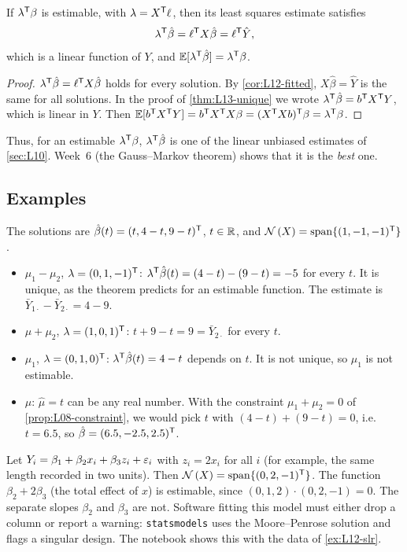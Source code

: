 \begin{proposition}\label{prop:L13-unbiased}
If $\lambda^{\mathsf T}\beta$ is estimable, with $\lambda=X^{\mathsf T}\ell$, then its least squares estimate satisfies
\[
\lambda^{\mathsf T}\hat\beta=\ell^{\mathsf T} X\hat\beta=\ell^{\mathsf T}\hat Y,
\]
which is a linear function of $Y$, and $\mathbb E[\lambda^{\mathsf T}\hat\beta]=\lambda^{\mathsf T}\beta$.
\end{proposition}
\begin{proof}
$\lambda^{\mathsf T}\hat\beta=\ell^{\mathsf T} X\hat\beta$ holds for every solution. By \cref{cor:L12-fitted}, $X\hat\beta=\hat Y$ is the same for
all solutions. In the proof of \cref{thm:L13-unique} we wrote $\lambda^{\mathsf T}\hat\beta=b^{\mathsf T} X^{\mathsf T} Y$, which is linear in $Y$.
Then $\mathbb E[b^{\mathsf T} X^{\mathsf T} Y]=b^{\mathsf T} X^{\mathsf T} X\beta=(X^{\mathsf T} Xb)^{\mathsf T}\beta=\lambda^{\mathsf T}\beta$.
\end{proof}
Thus, for an estimable $\lambda^{\mathsf T}\beta$, $\lambda^{\mathsf T}\hat\beta$ is one of the linear unbiased estimates of \cref{sec:L10}.
Week~6 (the Gauss--Markov theorem) shows that it is the \emph{best} one.

\subsection{Examples}
\begin{example}\label{ex:L13-oneway}
The solutions are $\hat\beta(t)=(t,4-t,9-t)^{\mathsf T}$, $t\in\mathbb R$, and $\mathcal{N}\left(X\right)=\mathrm{span}\{(1,-1,-1)^{\mathsf T}\}$.
\begin{itemize}
  \item $\mu_1-\mu_2$, $\lambda=(0,1,-1)^{\mathsf T}$: $\lambda^{\mathsf T}\hat\beta(t)=(4-t)-(9-t)=-5$ for every $t$. It is unique, as the theorem predicts for an estimable function. The estimate is $\bar Y_{1\cdot}-\bar Y_{2\cdot}=4-9$.
  \item $\mu+\mu_2$, $\lambda=(1,0,1)^{\mathsf T}$: $t+9-t=9=\bar Y_{2\cdot}$ for every $t$.
  \item $\mu_1$, $\lambda=(0,1,0)^{\mathsf T}$: $\lambda^{\mathsf T}\hat\beta(t)=4-t$ depends on $t$. It is not unique, so $\mu_1$ is not estimable.
  \item $\mu$: $\hat\mu=t$ can be any real number. With the constraint $\mu_1+\mu_2=0$ of \cref{prop:L08-constraint}, we would pick $t$ with $(4-t)+(9-t)=0$, i.e.\ $t=6.5$, so $\hat\beta=(6.5,-2.5,2.5)^{\mathsf T}$.
\end{itemize}
\end{example}

\begin{example}\label{ex:L13-collinear}
Let $Y_i=\beta_1+\beta_2x_i+\beta_3z_i+\varepsilon_i$ with $z_i=2x_i$ for all $i$ (for example, the same length recorded in two
units). Then $\mathcal{N}\left(X\right)=\mathrm{span}\{(0,2,-1)^{\mathsf T}\}$. The function $\beta_2+2\beta_3$ (the total effect of $x$) is
estimable, since $(0,1,2)\cdot(0,2,-1)=0$. The separate slopes $\beta_2$ and $\beta_3$ are not. Software fitting
this model must either drop a column or report a warning: \texttt{statsmodels} uses the
Moore--Penrose solution and flags a singular design. The notebook shows this with the data of
\cref{ex:L12-slr}.
\end{example}

